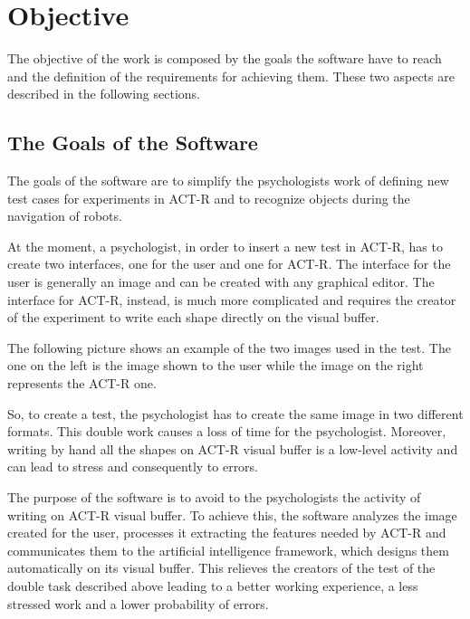 \chapter{Objective}

The objective of the work is composed by the goals the software have to reach and the definition of the requirements for achieving them. These two aspects are described in the following sections.

	\section{The Goals of the Software}
\begin{comment}to be developed\end{comment}
	The goals of the software  are to simplify the psychologists work of defining new test cases for experiments in ACT-R and to recognize objects during the navigation of robots.

	At the moment, a psychologist, in order to insert a new test in ACT-R, has to create two interfaces, one for the user and one for ACT-R.
	The interface for the user is generally an image and can be created with any graphical editor. 
	The interface for ACT-R, instead, is much more complicated and requires the creator of the experiment to write each shape directly on the visual buffer.  
	
	The following picture shows an example of the two images used in the test.
	The one on the left is the image shown to the user while the image on the right represents the ACT-R one. 


	So, to create a test, the psychologist has to create the same image in two different formats.
	This double work causes a loss of time for the psychologist. Moreover, writing by hand all the shapes on ACT-R visual buffer is a low-level activity and can lead to stress and consequently to errors.

\begin{comment}to be developed\end{comment}
	The purpose of the software is to avoid to the psychologists the activity of writing on ACT-R visual buffer. To achieve this, the software analyzes the image created for the user, processes it extracting the features needed by ACT-R and communicates them to the artificial intelligence framework, which designs them automatically on its visual buffer. 
	This relieves the creators of the test of the double task described above leading to a better working experience, a less stressed work and a lower probability of errors.
	

